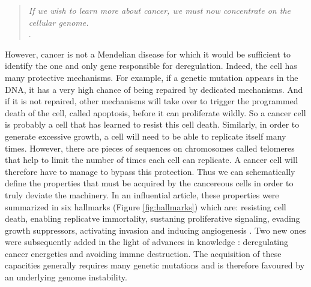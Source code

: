 \documentclass[a4paper,12pt,twoside,onecolumn,openright,final,oldfontcommands]{memoir}
\begin{document}
\begin{quote}
\emph{If we wish to learn more about cancer, we must now concentrate on
the cellular genome.}\\
\citep{dulbecco1986turning}.
\end{quote}

However, cancer is not a Mendelian disease for which it would be
sufficient to identify the one and only gene responsible for
deregulation. Indeed, the cell has many protective mechanisms. For
example, if a genetic mutation appears in the DNA, it has a very high
chance of being repaired by dedicated mechanisms. And if it is not
repaired, other mechanisms will take over to trigger the programmed
death of the cell, called apoptosis, before it can proliferate wildly.
So a cancer cell is probably a cell that has learned to resist this cell
death. Similarly, in order to generate excessive growth, a cell will
need to be able to replicate itself many times. However, there are
pieces of sequences on chromosomes called telomeres that help to limit
the number of times each cell can replicate. A cancer cell will
therefore have to manage to bypass this protection. Thus we can
schematically define the properties that must be acquired by the
cancereous cells in order to truly deviate the machinery. In an
influential article, these properties were summarized in six hallmarks
(Figure \ref{fig:hallmarks}) which are: resisting cell death, enabling
replicatve immortality, sustaning proliferative signaling, evading
growth suppressors, activating invasion and inducing angiogenesis
\citep{hanahan2000hallmarks}. Two new ones were subsequently added in
the light of advances in knowledge \citep{hanahan2011hallmarks}:
deregulating cancer energetics and avoiding immne destruction. The
acquisition of these capacities generally requires many genetic
mutations and is therefore favoured by an underlying genome instability.
\end{document}
